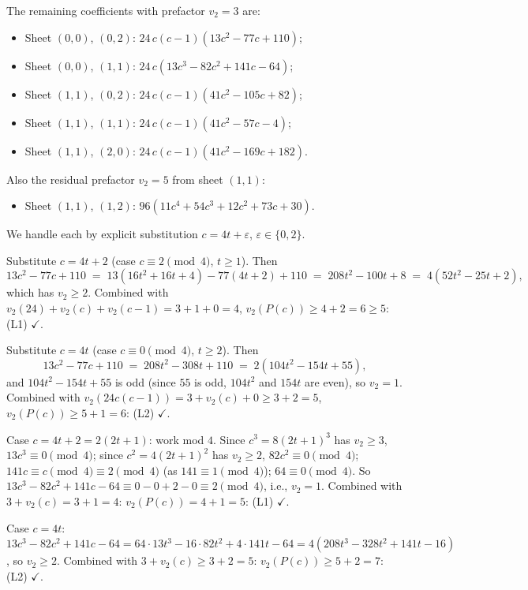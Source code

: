 \documentclass[11pt]{article}
\begin{document}
The remaining coefficients with prefactor $v_2 = 3$ are:
\begin{itemize}
\item[(a)] Sheet $(0,0)$, $(0,2)$: $24\,c(c-1)(13c^2 - 77c + 110)$;
\item[(b)] Sheet $(0,0)$, $(1,1)$: $24\,c(13c^3 - 82c^2 + 141c - 64)$;
\item[(c)] Sheet $(1,1)$, $(0,2)$: $24\,c(c-1)(41c^2 - 105c + 82)$;
\item[(d)] Sheet $(1,1)$, $(1,1)$: $24\,c(c-1)(41c^2 - 57c - 4)$;
\item[(e)] Sheet $(1,1)$, $(2,0)$: $24\,c(c-1)(41c^2 - 169c + 182)$.
\end{itemize}
Also the residual prefactor $v_2 = 5$ from sheet $(1,1)$:
\begin{itemize}
\item[(f)] Sheet $(1,1)$, $(1,2)$: $96(11c^4 + 54c^3 + 12c^2 + 73c + 30)$.
\end{itemize}

We handle each by explicit substitution $c = 4t + \varepsilon$, $\varepsilon \in \{0, 2\}$.

\medskip
{}
Substitute $c = 4t + 2$ (case $c \equiv 2 \pmod 4$, $t \ge 1$). Then
\[
  13c^2 - 77c + 110 \;=\; 13(16t^2 + 16t + 4) - 77(4t+2) + 110
   \;=\; 208t^2 - 100t + 8 \;=\; 4(52t^2 - 25t + 2),
\]
which has $v_2 \ge 2$. Combined with $v_2(24) + v_2(c) + v_2(c-1) = 3 + 1 + 0 = 4$,
$v_2(P(c)) \ge 4 + 2 = 6 \ge 5$: (L1) $\checkmark$.

Substitute $c = 4t$ (case $c \equiv 0 \pmod 4$, $t \ge 2$). Then
\[
  13c^2 - 77c + 110 \;=\; 208 t^2 - 308 t + 110 \;=\; 2(104 t^2 - 154 t + 55),
\]
and $104 t^2 - 154 t + 55$ is odd (since $55$ is odd, $104 t^2$ and $154 t$ are even),
so $v_2 = 1$. Combined with $v_2(24 c(c-1)) = 3 + v_2(c) + 0 \ge 3 + 2 = 5$,
$v_2(P(c)) \ge 5 + 1 = 6$: (L2) $\checkmark$.

\medskip
{}
Case $c = 4t + 2 = 2(2t+1)$: work mod $4$. Since $c^3 = 8(2t+1)^3$ has $v_2 \ge 3$, $13c^3 \equiv 0 \pmod 4$;
since $c^2 = 4(2t+1)^2$ has $v_2 \ge 2$, $82c^2 \equiv 0 \pmod 4$;
$141 c \equiv c \pmod 4 \equiv 2 \pmod 4$ (as $141 \equiv 1 \pmod 4$);
$64 \equiv 0 \pmod 4$.
So $13c^3 - 82c^2 + 141c - 64 \equiv 0 - 0 + 2 - 0 \equiv 2 \pmod 4$, i.e., $v_2 = 1$.
Combined with $3 + v_2(c) = 3 + 1 = 4$: $v_2(P(c)) = 4 + 1 = 5$: (L1) $\checkmark$.

Case $c = 4t$: $13c^3 - 82c^2 + 141c - 64 = 64\cdot 13 t^3 - 16\cdot 82 t^2 + 4\cdot 141 t - 64 = 4(208 t^3 - 328 t^2 + 141 t - 16)$,
so $v_2 \ge 2$. Combined with $3 + v_2(c) \ge 3 + 2 = 5$: $v_2(P(c)) \ge 5 + 2 = 7$: (L2) $\checkmark$.
\end{document}
